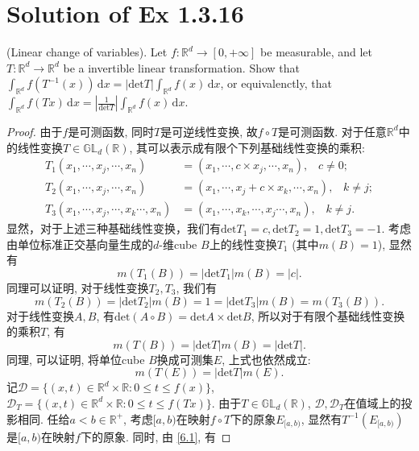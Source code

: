 \documentclass[reqno,a4paper,10pt]{amsart}
\newcommand\dif{\,\mathrm{d}}
\newcommand\Rnum{\mathbb{R}}
\newcommand{\abs}[1]{\left\vert#1\right\vert}
\begin{document}
\section{Solution of Ex 1.3.16}
(Linear change of variables). Let $f:\Rnum^d\to[0,+\infty]$ be measurable, and let $T:\Rnum^d\to\Rnum^d$ be a invertible linear transformation. Show that $\int_{\Rnum^d} f(T^{-1}(x))\dif x = \abs{\mathrm{det}T}\int_{\Rnum^d} f(x)\dif x$, or equivalenctly, that $\int_{\Rnum^d} f(Tx)\dif x=\abs{\frac{1}{\mathrm{det}T}}\int_{\Rnum^d} f(x)\dif x$.
\begin{proof}
    由于$f$是可测函数, 同时$T$是可逆线性变换, 故$f\circ T$是可测函数. 对于任意$\mathbb{R}^d$中的线性变换$T\in\mathbb{GL}_d(\mathbb{R})$, 其可以表示成有限个下列基础线性变换的乘积: 
    \begin{equation*}
        \begin{split}
            T_1(x_1,\cdots,x_j,\cdots, x_n)&=(x_1,\cdots,c\times x_j,\cdots, x_n),\;\;\; c\neq 0;\\
            T_2(x_1,\cdots,x_j,\cdots, x_n)&=(x_1,\cdots,x_j+c\times x_k,\cdots, x_n),\;\;\; k\neq j;\\
            T_3(x_1,\cdots,x_j,\cdots,x_k\cdots, x_n)&=(x_1,\cdots,x_k,\cdots,x_j\cdots, x_n),\;\;\; k\neq j.
        \end{split}
    \end{equation*}
    显然，对于上述三种基础线性变换，我们有$\mathrm{det}T_1=c,\mathrm{det}T_2=1,\mathrm{det}T_3=-1$. 考虑由单位标准正交基向量生成的$d$-维cube $B$上的线性变换$T_1$ (其中$m(B)=1$), 显然有
    \begin{equation*}
        m(T_1(B))=\abs{\mathrm{det}T_1}m(B)=\abs{c}.
    \end{equation*}
    同理可以证明, 对于线性变换$T_2,T_3$, 我们有
    \begin{equation*}
        m(T_2(B))=\abs{\mathrm{det}T_2}m(B)=1=\abs{\mathrm{det}T_3}m(B)=m(T_3(B)).
    \end{equation*}
    对于线性变换$A, B$, 有$\mathrm{det}(A\circ B)=\mathrm{det}A\times\mathrm{det}B$, 所以对于有限个基础线性变换的乘积$T$, 有
    \begin{equation*}
        m(T(B))=\abs{\mathrm{det}T}m(B)=\abs{\mathrm{det}T}.
    \end{equation*}
    同理, 可以证明, 将单位cube $B$换成可测集$E$, 上式也依然成立:
    \begin{equation}
        m(T(E))=\abs{\mathrm{det}T}m(E).
        \label{6.1}
    \end{equation}
    记$\mathcal{D}=\{(x,t)\in\Rnum^d\times \Rnum: 0\leq t\leq f(x)\}$, $\mathcal{D}_T=\{(x,t)\in\Rnum^d\times \Rnum: 0\leq t\leq f(Tx)\}$. 由于$T\in\mathbb{GL}_d(\mathbb{R})$, $\mathcal{D},\mathcal{D}_T$在值域上的投影相同. 任给$a<b\in\mathbb{R}^+$, 考虑$[a,b)$在映射$f\circ T$下的原象$E_{[a,b)}$, 显然有$T^{-1}(E_{[a,b)})$是$[a,b)$在映射$f$下的原象. 同时, 由 \eqref{6.1}, 有

\end{proof}
\end{document}
